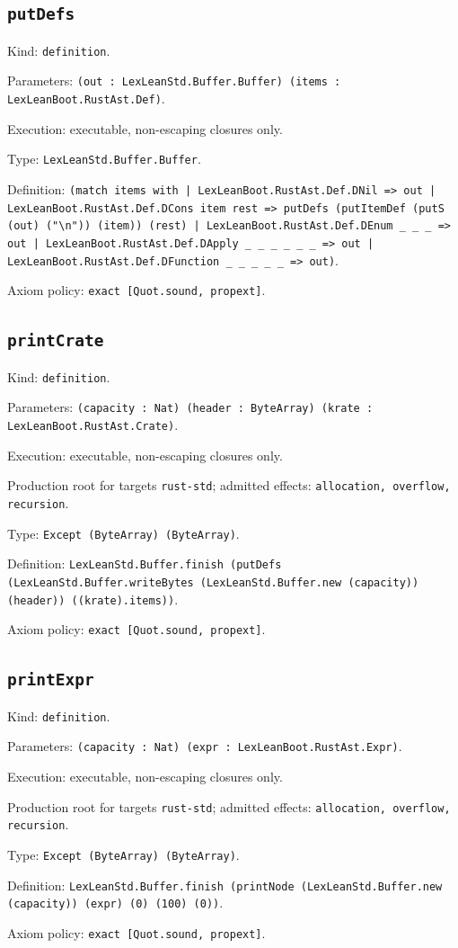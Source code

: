 \documentclass[11pt]{article}
\begin{document}
\subsection*{\texttt{putDefs}}
\noindent Kind: \texttt{definition}.\par
\noindent Parameters: \texttt{(out : LexLeanStd.Buffer.Buffer) (items : LexLeanBoot.RustAst.Def)}.\par
\noindent Execution: executable, non-escaping closures only.\par
\noindent Type: \texttt{LexLeanStd.Buffer.Buffer}.\par
\noindent Definition: \texttt{(match items with | LexLeanBoot.RustAst.Def.DNil => out | LexLeanBoot.RustAst.Def.DCons item rest => putDefs (putItemDef (putS (out) ("\textbackslash{}n")) (item)) (rest) | LexLeanBoot.RustAst.Def.DEnum \_ \_ \_ => out | LexLeanBoot.RustAst.Def.DApply \_ \_ \_ \_ \_ \_ => out | LexLeanBoot.RustAst.Def.DFunction \_ \_ \_ \_ \_ => out)}.\par
\noindent Axiom policy: \texttt{exact [Quot.sound, propext]}.\par
\subsection*{\texttt{printCrate}}
\noindent Kind: \texttt{definition}.\par
\noindent Parameters: \texttt{(capacity : Nat) (header : ByteArray) (krate : LexLeanBoot.RustAst.Crate)}.\par
\noindent Execution: executable, non-escaping closures only.\par
\noindent Production root for targets \texttt{rust-std}; admitted effects: \texttt{allocation, overflow, recursion}.\par
\noindent Type: \texttt{Except (ByteArray) (ByteArray)}.\par
\noindent Definition: \texttt{LexLeanStd.Buffer.finish (putDefs (LexLeanStd.Buffer.writeBytes (LexLeanStd.Buffer.new (capacity)) (header)) ((krate).items))}.\par
\noindent Axiom policy: \texttt{exact [Quot.sound, propext]}.\par
\subsection*{\texttt{printExpr}}
\noindent Kind: \texttt{definition}.\par
\noindent Parameters: \texttt{(capacity : Nat) (expr : LexLeanBoot.RustAst.Expr)}.\par
\noindent Execution: executable, non-escaping closures only.\par
\noindent Production root for targets \texttt{rust-std}; admitted effects: \texttt{allocation, overflow, recursion}.\par
\noindent Type: \texttt{Except (ByteArray) (ByteArray)}.\par
\noindent Definition: \texttt{LexLeanStd.Buffer.finish (printNode (LexLeanStd.Buffer.new (capacity)) (expr) (0) (100) (0))}.\par
\noindent Axiom policy: \texttt{exact [Quot.sound, propext]}.\par
\end{document}
